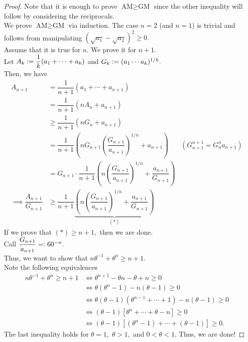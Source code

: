 \amgmhm*\label{thm:amgmhm2}
\begin{flushright}\hyperref[thm:amgmhm]{\upsym}\end{flushright}
\begin{proof} 
	Note that it is enough to prove $\text{AM} \ge \text{GM}$ since the other inequality will follow by considering the reciprocals.\\
	We prove $\text{AM} \ge \text{GM}$ via induction. The case $n = 2$ (and $n=1$) is trivial and follows from manipulating $(\sqrt{a_1} - \sqrt{a_2})^2 \ge 0.$\\
	Assume that it is true for $n.$ We prove it for $n + 1.$\\
	Let $A_k \vcentcolon= \dfrac{1}{k}(a_1 + \cdots + a_k)$ and $G_k \vcentcolon= (a_1\cdots a_k)^{1/k}.$\\
	Then, we have
	\begin{align*} 
		A_{n+1} &= \dfrac{1}{n+1}(a_1 + \cdots + a_{n+1})\\
		&= \dfrac{1}{n+1}(nA_n + a_{n+1})\\
		&\ge \dfrac{1}{n+1}(nG_n + a_{n+1})\\
		&= \dfrac{1}{n+1}\left(nG_{n+1}\left(\dfrac{G_{n+1}}{a_{n+1}}\right)^{1/n} + a_{n+1}\right) & (G_{n+1}^{n+1} = G_n^na_{n+1})\\
		&= G_{n+1}\cdot\dfrac{1}{n+1}\left(n\left(\dfrac{G_{n+1}}{a_{n+1}}\right)^{1/n} + \dfrac{a_{n+1}}{G_{n+1}}\right)\\
		\implies \dfrac{A_{n+1}}{G_{n+1}} &\ge\dfrac{1}{n+1}\underbrace{\left(n\left(\dfrac{G_{n+1}}{a_{n+1}}\right)^{1/n} + \dfrac{a_{n+1}}{G_{n+1}}\right)}_{(*)}
	\end{align*}
	If we prove that $(*) \ge n+1,$ then we are done.\\
	Call $\dfrac{G_{n+1}}{a_{n+1}} =\vcentcolon \theta^{-n}.$\\
	Thus, we want to show that $n\theta^{-1} + \theta^n \ge n+1.$\\
	Note the following equivalences
	\begin{align*} 
		n\theta^{-1} + \theta^n \ge n+1 &\iff \theta^{n+1} - \theta n - \theta + n \ge 0\\
		&\iff \theta(\theta^n - 1) - n(\theta - 1) \ge 0\\
		&\iff \theta(\theta - 1)(\theta^{n-1} + \cdots + 1) - n(\theta - 1) \ge 0\\
		&\iff (\theta - 1)[\theta^n + \cdots + \theta - n] \ge 0\\
		&\iff (\theta - 1)[(\theta^n - 1) + \cdots + (\theta - 1)] \ge 0.
	\end{align*}
	The last inequality holds for $\theta = 1,$ $\theta > 1,$ and $0 < \theta < 1.$ Thus, we are done!
\end{proof}

